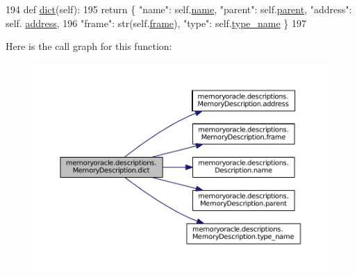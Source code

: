 \begin{DoxyCode}
194     \textcolor{keyword}{def }\hyperlink{classmemoryoracle_1_1descriptions_1_1MemoryDescription_aebd60209e758d2affe3b637a3eb4dca2}{dict}(self):
195         \textcolor{keywordflow}{return} \{ \textcolor{stringliteral}{"name"}: self.\hyperlink{classmemoryoracle_1_1descriptions_1_1Description_a4b27c3ae1ef0ab35ec0f990fa553b8b3}{name}, \textcolor{stringliteral}{"parent"}: self.\hyperlink{classmemoryoracle_1_1descriptions_1_1MemoryDescription_a15bf69de6eaa0dad24b464f388bf1bef}{parent}, \textcolor{stringliteral}{"address"}: self.
      \hyperlink{classmemoryoracle_1_1descriptions_1_1MemoryDescription_a17ade99360fb76de33af7cfa3181198b}{address},
196                 \textcolor{stringliteral}{"frame"}: str(self.\hyperlink{classmemoryoracle_1_1descriptions_1_1MemoryDescription_a77ab2795f43cc1b5ccc849f55d79b7be}{frame}), \textcolor{stringliteral}{"type"}: self.\hyperlink{classmemoryoracle_1_1descriptions_1_1MemoryDescription_aa67a52a7ce77ac27d2d2e2d7818c9ffc}{type\_name} \}
197 
\end{DoxyCode}


Here is the call graph for this function\+:
\nopagebreak
\begin{figure}[H]
\begin{center}
\leavevmode
\includegraphics[width=350pt]{classmemoryoracle_1_1descriptions_1_1MemoryDescription_aebd60209e758d2affe3b637a3eb4dca2_cgraph}
\end{center}
\end{figure}


\hypertarget{classmemoryoracle_1_1descriptions_1_1MemoryDescription_a2fd120fa38b13cd11940ec83eb8d04f3}{}
